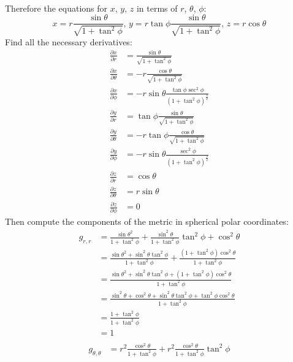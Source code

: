 \documentclass[9pt]{report}
\begin{document}
\begin{enumerate}
\begin{enumerate}
\[\begin{align*}
    \end{align*}
  \]
  Therefore the equations for $x$, $y$, $z$ in terms of $r$, $\theta$, $\phi$:
  \[
    x = r \frac{\sin\theta}{\sqrt{1+\tan^2\phi} }\text{,\ \ }
    y = r \tan\phi \frac{\sin \theta}{\sqrt{1+\tan^2\phi}}\text{,\ \ }
    z = r \cos\theta
  \]
  Find all the necessary derivatives:
  \[
    \begin{align*}
    \frac{\partial x}{\partial r} &= \frac{\sin\theta}{\sqrt{1+\tan^2\phi}}\\
    \frac{\partial x}{\partial \theta} &= -r\frac{\cos\theta}{\sqrt{1+\tan^2\phi}}\\
    \frac{\partial x}{\partial \phi} &= -r \sin \theta \frac{\tan\phi \sec^2\phi}{(1+\tan^2\phi)^\frac{3}{2}} \\
    \frac{\partial y}{\partial r} &= \tan\phi\frac{\sin\theta}{\sqrt{1+\tan^2\phi} }\\
    \frac{\partial y}{\partial \theta} &= -r \tan\phi\frac{\cos\theta}{\sqrt{1+\tan^2\phi}}\\
    \frac{\partial y}{\partial \phi} &= -r\sin\theta \frac{\sec^2\phi}{(1+\tan^2\phi)^\frac{3}{2}}\\
    \frac{\partial z}{\partial r} &= \cos\theta\\
    \frac{\partial z}{\partial \theta} &= r\sin\theta\\
    \frac{\partial z}{\partial \phi} &= 0
    \end{align*}
  \]
  Then compute the components of the metric in spherical polar coordinates:
  \[
    \begin{align*}
      g_{r,r}&=\frac{\sin\theta^2}{1+\tan^2\phi} + \frac{\sin^2\theta}{1+\tan^2\phi}\tan^2\phi + \cos^2\theta\\
      &=\frac{\sin\theta^2 + \sin^2\theta\tan^2\phi}{1+\tan^2\phi} +\frac{(1+\tan^2\phi)\cos^2\theta}{1+\tan^2\phi}\\
      &=\frac{\sin\theta^2 + \sin^2\theta\tan^2\phi+(1+\tan^2\phi)\cos^2\theta}{1+\tan^2\phi}\\
      &=\frac{\sin^2\theta + \cos^2\theta+\sin^2\theta\tan^2\phi+\tan^2\phi\cos^2\theta}{1+\tan^2\phi}\\
      &=\frac{1+\tan^2\phi}{1+\tan^2\phi}\\
      &=1\\
    \end{align*}
  \]
  \[
    \begin{align*}
      g_{\theta,\theta}&=
      r^2 \frac{\cos^2\theta}{1+\tan^2\phi}+
      r^2 \frac{\cos^2\theta}{1+\tan^2\phi}\tan^2\phi

\end{align*}\]
\end{enumerate}
\end{enumerate}
\end{document}
